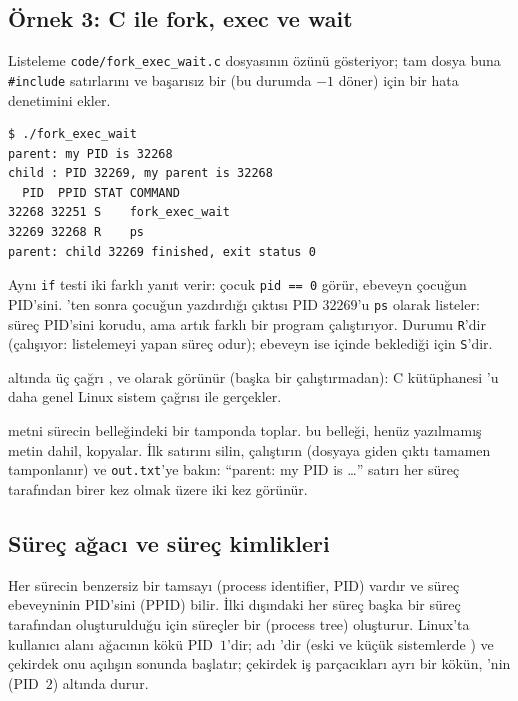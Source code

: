 \subsection{Örnek 3: C ile fork, exec ve wait}

Listeleme \texttt{code/fork\_exec\_wait.c} dosyasının özünü gösteriyor; tam dosya buna \texttt{\#include} satırlarını ve başarısız bir  (bu durumda $-1$ döner) için bir hata denetimini ekler.



\begin{lstlisting}[style=term]
$ ./fork_exec_wait
parent: my PID is 32268
child : PID 32269, my parent is 32268
  PID  PPID STAT COMMAND
32268 32251 S    fork_exec_wait
32269 32268 R    ps
parent: child 32269 finished, exit status 0
\end{lstlisting}

Aynı \texttt{if} testi iki farklı yanıt verir: çocuk \texttt{pid == 0} görür, ebeveyn çocuğun PID'sini. 'ten sonra çocuğun yazdırdığı  çıktısı PID $32269$'u \texttt{ps} olarak listeler: süreç PID'sini korudu, ama artık farklı bir program çalıştırıyor. Durumu \texttt{R}'dir (çalışıyor: listelemeyi yapan süreç odur); ebeveyn ise  içinde beklediği için \texttt{S}'dir.

 altında üç çağrı ,  ve  olarak görünür (başka bir çalıştırmadan): C kütüphanesi 'u daha genel Linux sistem çağrısı  ile gerçekler.

\begin{tryit}
 metni sürecin belleğindeki bir tamponda toplar.  bu belleği, henüz yazılmamış metin dahil, kopyalar. İlk  satırını silin,  çalıştırın (dosyaya giden çıktı tamamen tamponlanır) ve \texttt{out.txt}'ye bakın: ``parent: my PID is \dots'' satırı her süreç tarafından birer kez olmak üzere iki kez görünür.
\end{tryit}


\subsection{Süreç ağacı ve süreç kimlikleri}

Her sürecin benzersiz bir tamsayı  (process identifier, PID) vardır ve süreç ebeveyninin PID'sini (PPID) bilir. İlki dışındaki her süreç başka bir süreç tarafından oluşturulduğu için süreçler bir  (process tree) oluşturur. Linux'ta kullanıcı alanı ağacının kökü PID~$1$'dir; adı 'dir (eski ve küçük sistemlerde ) ve çekirdek onu açılışın sonunda başlatır; çekirdek iş parçacıkları ayrı bir kökün, 'nin (PID~$2$) altında durur.

